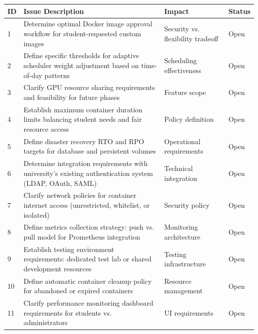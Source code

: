 \documentclass[12pt,a4paper]{article}
\begin{document}
\begin{longtable}{|p{1cm}|p{5cm}|p{4cm}|p{2.5cm}|}
    \hline
    \textbf{ID} & \textbf{Issue Description} & \textbf{Impact} & \textbf{Status} \\
    \hline
    \endhead
    
    1 & Determine optimal Docker image approval workflow for student-requested custom images & Security vs. flexibility tradeoff & Open \\
    \hline
    
    2 & Define specific thresholds for adaptive scheduler weight adjustment based on time-of-day patterns & Scheduling effectiveness & Open \\
    \hline
    
    3 & Clarify GPU resource sharing requirements and feasibility for future phases & Feature scope & Open \\
    \hline
    
    4 & Establish maximum container duration limits balancing student needs and fair resource access & Policy definition & Open \\
    \hline
    
    5 & Define disaster recovery RTO and RPO targets for database and persistent volumes & Operational requirements & Open \\
    \hline
    
    6 & Determine integration requirements with university's existing authentication system (LDAP, OAuth, SAML) & Technical integration & Open \\
    \hline
    
    7 & Clarify network policies for container internet access (unrestricted, whitelist, or isolated) & Security policy & Open \\
    \hline
    
    8 & Define metrics collection strategy: push vs. pull model for Prometheus integration & Monitoring architecture & Open \\
    \hline
    9 & Establish testing environment requirements: dedicated test lab or shared development resources & Testing infrastructure & Open \\
    \hline
    
    10 & Define automatic container cleanup policy for abandoned or expired containers & Resource management & Open \\
    \hline
    
    11 & Clarify performance monitoring dashboard requirements for students vs. administrators & UI requirements & Open \\
    \hline
    

\end{longtable}
\end{document}
